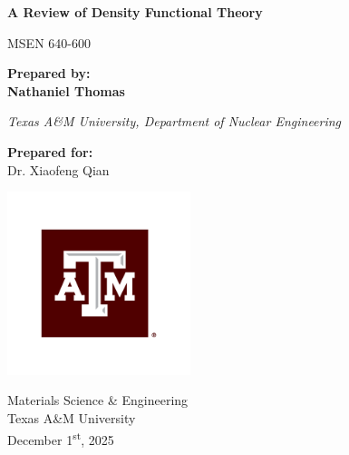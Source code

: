 \thispagestyle{empty}

\begin{titlepage}
  \begin{center}
    \vspace*{1cm}

    \Huge
    \textbf{A Review of Density Functional Theory}

    \vspace{0.8cm}

    \LARGE
    MSEN 640-600

    \vspace{2cm}

    \Large
    \textbf{Prepared by:}\\[0.5cm]
    \huge
    \textbf{Nathaniel Thomas} \par
    \Large
    \textit{Texas A\&M University, Department of Nuclear Engineering}

    \vspace{1cm}

    \textbf{Prepared for:}\\[0.5cm]
    \large
    Dr. Xiaofeng Qian

    \vfill

    \includegraphics[width=0.4\textwidth]{"./assets/a&m_logo.pdf"}

    \vspace{1cm}

    \Large
    Materials Science \& Engineering\\
    Texas A\&M University\\
    \vspace{0.5cm}
    \large
    December 1\textsuperscript{st}, 2025

  \end{center}
\end{titlepage}

\lfoot{}
\cfoot{\thepage}
\rfoot{}

\headrule
